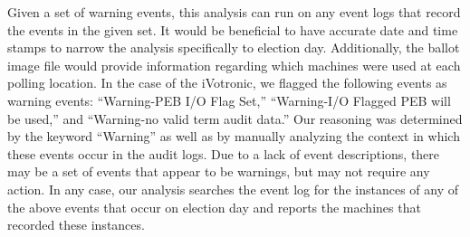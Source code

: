 Given a set of warning events, this analysis can run on any event logs that record the events in the given set. It would be beneficial to have accurate date and time stamps to narrow the analysis specifically to election day. Additionally, the ballot image file would provide information regarding which machines were used at each polling location.  In the case of the iVotronic, we flagged the following events as warning events: \textquotedblleft Warning-PEB I/O Flag Set,\textquotedblright \hspace{1 mm} \textquotedblleft Warning-I/O Flagged PEB will be used,\textquotedblright \hspace{1 mm} and \textquotedblleft Warning-no valid term audit data.\textquotedblright \hspace{2 mm} Our reasoning was determined by the keyword \textquotedblleft Warning\textquotedblright \hspace{1 mm} as well as by manually analyzing the context in which these events occur in the audit logs. Due to a lack of event descriptions, there may be a set of events that appear to be warnings, but may not require any action. In any case, our analysis searches the event log for the instances of any of the above events that occur on election day and reports the machines that recorded these instances. 
